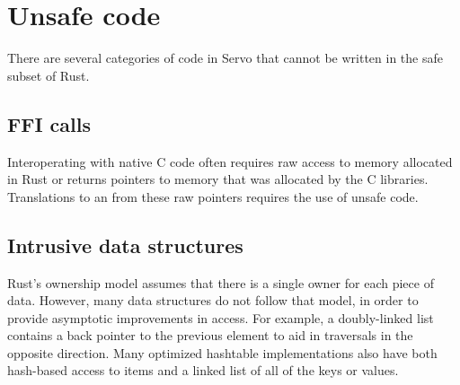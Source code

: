 
\section{Unsafe code}
\label{sec:safety}

There are several categories of code in Servo that cannot be written in the safe subset of Rust.

\subsection{FFI calls}

Interoperating with native C code often requires raw access to memory allocated in Rust or returns
pointers to memory that was allocated by the C libraries.
Translations to an from these raw pointers requires the use of unsafe code.

\subsection{Intrusive data structures}

Rust's ownership model assumes that there is a single owner for each piece of data.
However, many data structures do not follow that model, in order to provide asymptotic
improvements in access.
For example, a doubly-linked list contains a back pointer to the previous element to aid
in traversals in the opposite direction.
Many optimized hashtable implementations also have both hash-based access to items
and a linked list of all of the keys or values.

